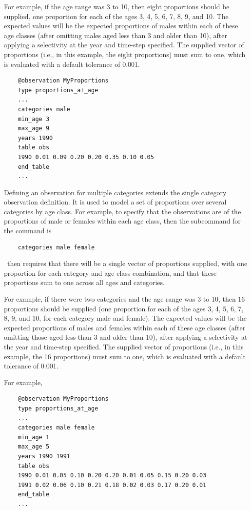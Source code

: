 For example, if the age range was 3 to 10, then eight proportions should be supplied, one proportion for each of the ages 3, 4, 5, 6, 7, 8, 9, and 10. The expected values will be the expected proportions of males within each of these age classes (after omitting males aged less than 3 and older than 10), after applying a selectivity at the year and time-step specified. The supplied vector of proportions (i.e., in this example, the eight proportions) must sum to one, which is evaluated with a default tolerance of 0.001.

{\small{\begin{verbatim}
	@observation MyProportions
	type proportions_at_age
	...
	categories male
	min_age 3
	max_age 9
	years 1990
	table obs
	1990 0.01 0.09 0.20 0.20 0.35 0.10 0.05
	end_table
	...
\end{verbatim}}}

Defining an observation for multiple categories extends the single category observation definition. It is used to model a set of proportions over several categories by age class. For example, to specify that the observations are of the proportions of male or females within each age class, then the subcommand  for the  command is

{\small{\begin{verbatim}
	categories male female
\end{verbatim}}}

\CNAME\ then requires that there will be a single vector of proportions supplied, with one proportion for each category and age class combination, and that these proportions sum to one across all ages and categories.

For example, if there were two categories and the age range was 3 to 10, then 16 proportions should be supplied (one proportion for each of the ages 3, 4, 5, 6, 7, 8, 9, and 10, for each category male and female). The expected values will be the expected proportions of males and females within each of these age classes (after omitting those aged less than 3 and older than 10), after applying a selectivity at the year and time-step specified. The supplied vector of proportions (i.e., in this example, the 16 proportions) must sum to one, which is evaluated with a default tolerance of 0.001.

For example,

{\small{\begin{verbatim}
	@observation MyProportions
	type proportions_at_age
	...
	categories male female
	min_age 1
	max_age 5
	years 1990 1991
	table obs
	1990 0.01 0.05 0.10 0.20 0.20 0.01 0.05 0.15 0.20 0.03
	1991 0.02 0.06 0.10 0.21 0.18 0.02 0.03 0.17 0.20 0.01
	end_table
	...
\end{verbatim}}}

